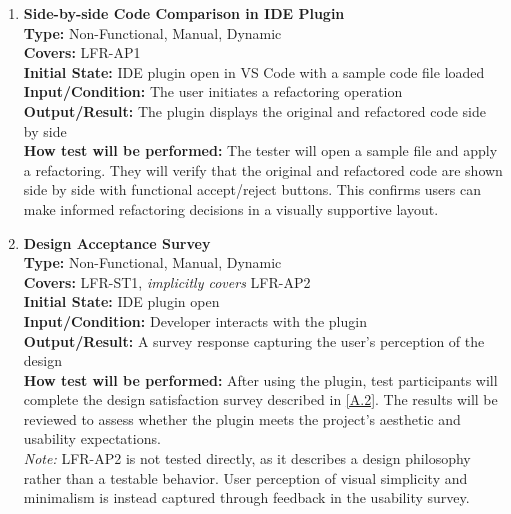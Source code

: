 \documentclass[12pt, titlepage]{article}
\begin{document}
\begin{enumerate}[label={\bf \textcolor{Maroon}{test-LF-\arabic*}}, wide=0pt, font=\itshape]
  
  \item \textbf{Side-by-side Code Comparison in IDE Plugin} \\[2mm]
    \textbf{Type:} Non-Functional, Manual, Dynamic \\
    \textbf{Covers:} LFR-AP1 \\ 
    \textbf{Initial State:} IDE plugin open in VS Code with a sample
    code file loaded \\ 
    \textbf{Input/Condition:} The user initiates a refactoring operation \\ 
    \textbf{Output/Result:} The plugin displays the original and
    refactored code side by side \\[2mm]
    \textbf{How test will be performed:} The tester will open a
    sample file and apply a refactoring. They will verify that the
    original and refactored code are shown side by side with
    functional accept/reject buttons. This confirms users can make
    informed refactoring decisions in a visually supportive layout.

  \item \textbf{Design Acceptance Survey} \\[2mm]
    \textbf{Type:} Non-Functional, Manual, Dynamic \\
    \textbf{Covers:} LFR-ST1, \textit{implicitly covers} LFR-AP2 \\ 
    \textbf{Initial State:} IDE plugin open \\ 
    \textbf{Input/Condition:} Developer interacts with the plugin \\ 
    \textbf{Output/Result:} A survey response capturing the user’s
    perception of the design \\[2mm]
    \textbf{How test will be performed:} After using the plugin,
    test participants will complete the design satisfaction survey
    described in \ref{A.2}. The results will be reviewed to assess
    whether the plugin meets the project's aesthetic and usability
    expectations.\\

    \textit{Note:} LFR-AP2 is not tested directly, as it describes a
    design philosophy rather than a testable behavior. User perception of
    visual simplicity and minimalism is instead captured through feedback
    in the usability survey.

\end{enumerate}
\end{document}

